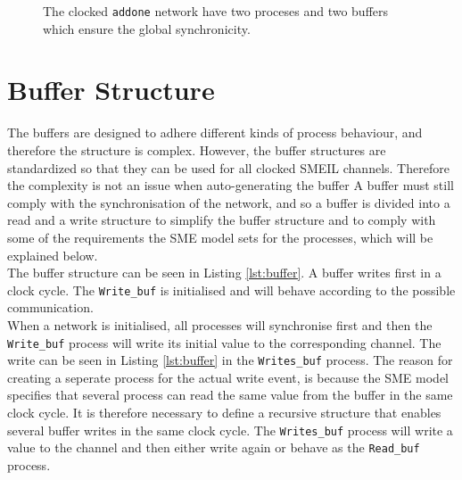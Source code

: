 \begin{figure}
\centering
{}
\caption{The clocked \texttt{addone} network have two proceses and two buffers which ensure the global synchronicity.}
\label{fig:addone_clocked}
\end{figure}
\section{Buffer Structure}
The buffers are designed to adhere different kinds of process behaviour, and therefore the structure is complex. However, the buffer structures are standardized so that they can be used for all clocked SMEIL channels. Therefore the complexity is not an issue when auto-generating the buffer A buffer must still comply with the synchronisation of the network, and so a buffer is divided into a read and a write structure to simplify the buffer structure and to comply with some of the requirements the SME model sets for the processes, which will be explained below. \\

The buffer structure can be seen in Listing \ref{lst:buffer}.
A buffer writes first in a clock cycle. The \texttt{Write\_buf} is initialised and will behave according to the possible communication.\\

When a network is initialised, all processes will synchronise first and then the \texttt{Write\_buf} process will write its initial value to the corresponding channel. The write can be seen in Listing \ref{lst:buffer} in the \texttt{Writes\_buf} process. The reason for creating a seperate process for the actual write event, is because the SME model specifies that several process can read the same value from the buffer in the same clock cycle. It is therefore necessary to define a recursive structure that enables several buffer writes in the same clock cycle. The \texttt{Writes\_buf} process will write a value to the channel and then either write again or behave as the \texttt{Read\_buf} process.\\

